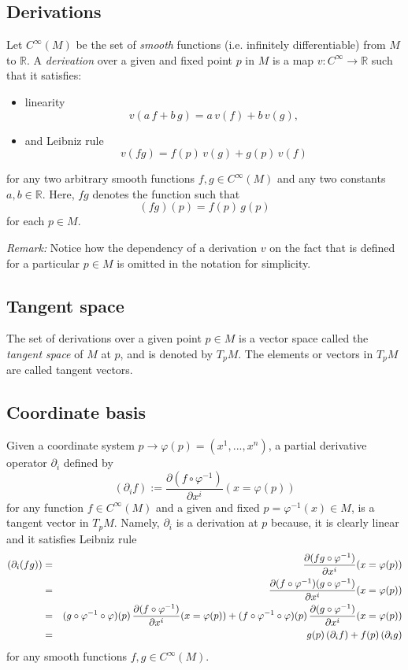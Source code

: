 \documentclass[aps,prl,twocolumn,groupedaddress]{revtex4-2}
\newcommand{\RR}{\mathbb{R}}
\begin{document}
\subsection{Derivations}

Let $C^{\infty}(M)$ be the set of {\em smooth} functions (i.e. infinitely differentiable) from $M$ to $\RR$.
A {\em derivation} over a given and fixed point $p$ in $M$ is a map $v:C^{\infty}\to \RR$ such that it satisfies:
\begin{itemize}
\item linearity
$$
v(a\,f+b\,g) = a\,v(f)+b\,v(g),
$$
\item and Leibniz rule
$$
v(fg)
=
f(p)\,v(g)
+
g(p)\,v(f)
$$
\end{itemize}
for any two arbitrary smooth functions $f,g\in C^{\infty}(M)$ and any two constants $a,b\in \RR$.
Here, $fg$ denotes the function such that
$$
(fg)(p)
=
f(p)\,g(p)
$$
for each $p\in M$.

{\em Remark:} Notice how the dependency of a derivation $v$ on the fact that is defined for a particular $p\in M$ is omitted in the notation for simplicity.

\subsection{Tangent space}

The set of derivations over a given point $p\in M$ is a vector space called the {\em tangent space} of $M$ at $p$, and is denoted by $T_pM$.
The elements or vectors in $T_pM$ are called tangent vectors.

\subsection{Coordinate basis}

Given a coordinate system $p \to \varphi(p) = (x^1,...,x^n)$, a partial derivative operator $\partial_i$ defined by
$$
(\partial_i f)
:=
\frac{\partial (f\circ \varphi^{-1})}{\partial x^i}(x=\varphi(p))
$$
for any function $f\in C^{\infty}(M)$ and a given and fixed $p=\varphi^{-1}(x) \in M$, is a tangent vector in $T_pM$.
Namely, $\partial_i$ is a derivation at $p$ because, it is clearly linear and it satisfies Leibniz rule
\begin{eqnarray}
(\partial_i (fg))
&=&
\frac{\partial (fg\circ \varphi^{-1})}{\partial x^i}(x=\varphi(p))
\notag
\\
&=&
\frac{\partial (f\circ \varphi^{-1}) (g\circ \varphi^{-1})}{\partial x^i}(x=\varphi(p))
\notag
\\
&=&
(g\circ \varphi^{-1} \circ \varphi)(p)
\,
\frac{\partial (f\circ \varphi^{-1})}{\partial x^i}(x=\varphi(p))
+
(f\circ \varphi^{-1} \circ \varphi)(p)
\,
\frac{\partial (g\circ \varphi^{-1})}{\partial x^i}(x=\varphi(p))
\notag
\\
&=&
g(p)
\,
(\partial_i f)
+
f(p)
\,
(\partial_i g)
\notag
\end{eqnarray}
for any smooth functions $f,g\in C^{\infty}(M)$.
\end{document}

